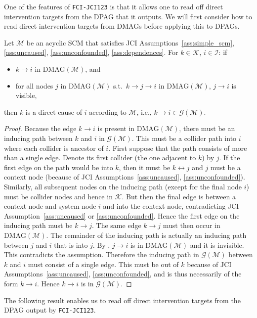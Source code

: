 \documentclass[twoside,11pt]{article}
\newcommand\C[1]{\mathcal{#1}}
\newcommand{\oto}{\leftrightarrow}
\newcommand{\DMAG}{\mathrm{DMAG}}
\newcommand{\alg}[1]{\texttt{#1}}
\newcommand{\JCIABC}{\ref{ass:uncaused}, \ref{ass:unconfounded}, \ref{ass:dependences}}
\newcommand{\JCIAB}{\ref{ass:uncaused}, \ref{ass:unconfounded}}
\begin{document}
One of the features of \alg{FCI-JCI123} is that it allows one to read off direct intervention targets from the DPAG that it outputs.
We will first consider how to read direct intervention targets from DMAGs before applying this to DPAGs.
\begin{lemma}\label{lemm:fci_jci123_mag}
  Let $\C{M}$ be an acyclic SCM that satisfies JCI Assumptions~\ref{ass:simple_scm}, \JCIABC.
  For $k \in \C{K}$, $i \in \C{I}$: if
  \begin{itemize}
    \item $k \to i$ in $\DMAG(\C{M})$, and 
    \item for all nodes $j$ in $\DMAG(\C{M})$ s.t.\ $k \to j \to i$ in $\DMAG(\C{M})$, $j \to i$ is visible,
  \end{itemize}
  then $k$ is a direct cause of $i$ according to $\C{M}$, i.e., $k \to i \in \C{G}(\C{M})$.
\end{lemma}
\begin{proof}
  Because the edge $k \to i$ is present in $\DMAG(\C{M})$, there must be an inducing path between $k$ and $i$ in $\C{G}(\C{M})$.
  This must be a collider path into $i$ where each collider is ancestor of $i$.
  First suppose that the path consists of more than a single edge. 
  Denote its first collider (the one adjacent to $k$) by $j$.
  If the first edge on the path would be into $k$, then it must be $k \oto j$ and $j$ must be a context node (because of JCI Assumptions~\JCIAB).
  Similarly, all subsequent nodes on the inducing path (except for the final node $i$) must be collider nodes and hence in $\C{K}$.  
  But then the final edge is between a context node and system node $i$ and into the context node, contradicting JCI Assumption~\ref{ass:uncaused} or \ref{ass:unconfounded}.
  Hence the first edge on the inducing path must be $k \to j$.
  The same edge $k \to j$ must then occur in $\DMAG(\C{M})$.
  The remainder of the inducing path is actually an inducing path between $j$ and $i$ that is into $j$. 
  By \citet[Lemma 9]{Zhang2008_JMLR}, $j \to i$ is in $\DMAG(\C{M})$ and it is invisible.
  This contradicts the assumption.
  Therefore the inducing path in $\C{G}(\C{M})$ between $k$ and $i$ must consist of a single edge.
  This must be out of $k$ because of JCI Assumptions~\JCIAB, and is thus necessarily of the form $k \to i$.
  Hence $k \to i$ is in $\C{G}(\C{M})$.
\end{proof}
The following result enables us to read off direct intervention targets from the DPAG output by \alg{FCI-JCI123}.
\end{document}
